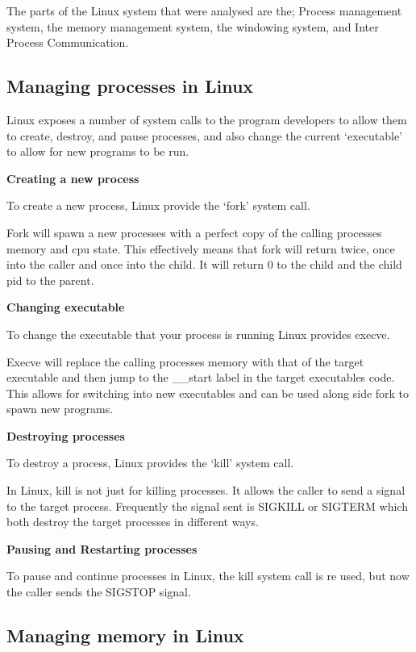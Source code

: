 \documentclass[a4paper]{report}
\begin{document}
The parts of the Linux system that were analysed are the; Process management system, the memory management system, the windowing system, and Inter Process Communication.

\subsection{Managing processes in Linux}

Linux exposes a number of system calls to the program developers to allow them to create, destroy, and pause processes, and also change the current `executable' to allow for new programs to be run.

\noindent
\textbf{Creating a new process}

To create a new process, Linux provide the `fork' system call.

Fork will spawn a new processes with a perfect copy of the calling processes memory and cpu state. This effectively means that fork will return twice, once into the caller and once into the child. It will return 0 to the child and the child pid to the parent.

\noindent
\textbf{Changing executable}

To change the executable that your process is running Linux provides execve.

Execve will replace the calling processes memory with that of the target executable and then jump to the \_\_start label in the target executables code. This allows for switching into new executables and can be used along side fork to spawn new programs.

\noindent
\textbf{Destroying processes}

To destroy a process, Linux provides the `kill' system call.

In Linux, kill is not just for killing processes. It allows the caller to send a signal to the target process. Frequently the signal sent is SIGKILL or SIGTERM which both destroy the target processes in different ways.

\noindent
\textbf{Pausing and Restarting processes}

To pause and continue processes in Linux, the kill system call is re used, but now the caller sends the SIGSTOP signal.

\subsection{Managing memory in Linux}
\end{document}
